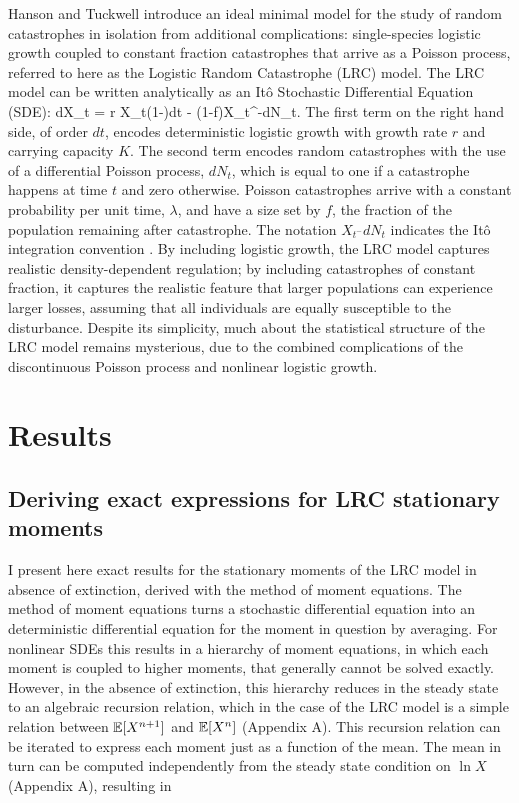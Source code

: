 Hanson and Tuckwell \cite{hanson1981} introduce an ideal minimal model for the study of random catastrophes in isolation from additional complications: single-species logistic growth coupled to constant fraction catastrophes that arrive as a Poisson process, referred to here as the Logistic Random Catastrophe (LRC) model.  The LRC model can be written analytically as an It\^{o} Stochastic Differential Equation (SDE):
\be
dX_t = r X_t\left(1-\right)dt  - (1-f)X_{t^-}dN_t.
\ee
\noindent The first term on the right hand side, of order $dt$, encodes deterministic logistic growth with growth rate $r$ and carrying capacity $K$.  The second term encodes random catastrophes with the use of a differential Poisson process, $dN_t$, which is equal to one if a catastrophe happens at time $t$ and zero otherwise.  Poisson catastrophes arrive with a constant probability per unit time, $\lambda$, and have a size set by $f$, the fraction of the population remaining after catastrophe.  The notation $X  _{t^-}dN_t$ indicates the It\^{o} integration convention \cite{hansonBook}.  By including logistic growth, the LRC model captures realistic density-dependent regulation; by including catastrophes of constant fraction, it captures the realistic feature that larger populations can experience larger losses, assuming that all individuals are equally susceptible to the disturbance.  Despite its simplicity, much about the statistical structure of the LRC model remains mysterious, due to the combined complications of the discontinuous Poisson process and nonlinear logistic growth.

\section{Results}
\subsection{Deriving exact expressions for LRC stationary moments}

I present here exact results for the stationary moments of the LRC model in absence of extinction, derived with the method of moment equations.  The method of moment equations turns a stochastic differential equation into an deterministic differential equation for the moment in question by averaging.  For nonlinear SDEs this results in a hierarchy of moment equations, in which each moment is coupled to higher moments, that generally cannot be solved exactly.  However, in the absence of extinction, this hierarchy reduces in the steady state to an algebraic recursion relation, which in the case of the LRC model is a simple relation between $\mathbb{E}[X^{n+1}]$ and $\mathbb{E}[X^{n}]$ (Appendix A).  This recursion relation can be iterated to express each moment just as a function of the mean.  The mean in turn can be computed independently from the steady state condition on $\ln X$ (Appendix A), resulting in  

